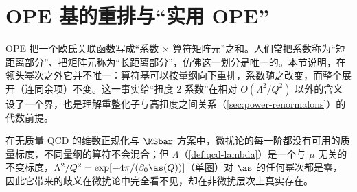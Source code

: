 \section{OPE 基的重排与“实用 OPE”}\label{sec:power-ope-basis}

OPE 把一个欧氏关联函数写成“系数 $\times$ 算符矩阵元”之和。人们常把系数称为“短距离部分”、把矩阵元称为“长距离部分”，仿佛这一划分是唯一的。本节说明，在领头幂次之外它并不唯一：算符基可以按量纲向下重排，系数随之改变，而整个展开（连同余项）不变。这一事实给“扭度 2 系数”在相对 $O(\Lambda^2/Q^2)$ 以外的含义设了一个界，也是理解重整化子与高扭度之间关系（\cref{sec:power-renormalons}）的代数前提。

在无质量 QCD 的维数正规化与 $\MSbar$ 方案中，微扰论的每一阶都没有可用的质量标度，不同量纲的算符不会混合；但 $\Lambda$（\cref{def:qcd-lambda}）是一个与 $\mu$ 无关的不变标度，$\Lambda^2/Q^2=\exp[-4\pi/(\beta_0\as(Q))]$（单圈）对 $\as$ 的任何幂次都是零，因此它带来的歧义在微扰论中完全看不见，却在非微扰层次上真实存在。

